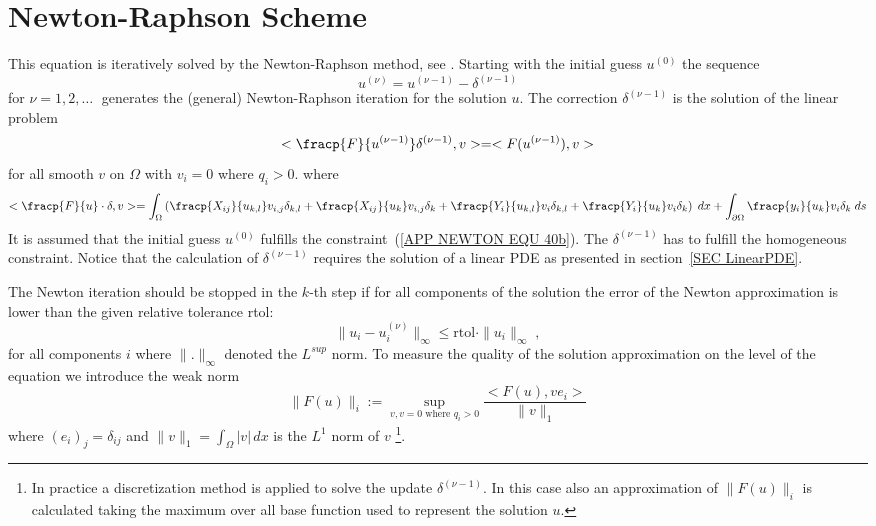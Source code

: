 \section{Newton-Raphson Scheme}
This equation is iteratively solved by the Newton-Raphson method, see \cite{Kelley2004a}.
Starting with the initial guess
$u^{(0)}$ the sequence
\begin{equation} \label{APP NEWTON EQU 43}
  u^{(\nu)}= u^{(\nu-1)} - \delta^{(\nu-1)}
\end{equation}
for $\nu=1,2,\ldots \;$ generates the (general) Newton-Raphson iteration for the
solution $u$. The correction $\delta^{(\nu-1)}$ is the solution of the linear problem
\begin{equation} \label{APP NEWTON EQU 43b0}
< \fracp{F}{u^{(\nu-1)}} \delta^{(\nu-1)} ,v > = <F(u^{(\nu-1)}),v>
\end{equation}
for all smooth $v$ on $\Omega$ with $v_i=0$ where $q_i>0$. 
where
\begin{equation} \label{APP NEWTON EQU 43b}
< \fracp{F}{u} \cdot \delta ,v > = 
\int_{\Omega} \left( \fracp{X_{ij}}{u_{k,l}} v_{i,j}\delta_{k,l} + 
\fracp{X_{ij}}{u_{k}} v_{i,j}\delta_{k} + \fracp{Y_{i}}{u_{k,l}} v_{i}\delta_{k,l} + 
\fracp{Y_{i}}{u_{k}} v_{i}\delta_{k} \right) \; dx 
+ \int_{\partial \Omega} 
\fracp{y_{i}}{u_{k}} v_{i}\delta_{k} \; ds 
\end{equation}
It is assumed that the initial guess $u^{(0)}$ fulfills the constraint~(\ref{APP NEWTON EQU 40b}). 
The $\delta^{(\nu-1)}$ has to fulfill the homogeneous constraint. 
Notice that the calculation of $\delta^{(\nu-1)}$ requires the solution of a linear PDE
as presented in section~\ref{SEC LinearPDE}.

The Newton iteration should be stopped in the $k$-th step if for
all components of the solution the error of the Newton
approximation is lower than the given relative tolerance {rtol}:
\begin{equation}\label{APP NEWTON EQU 61}
    \| u_{i} - u_{i}^{(\nu)} \|_{\infty} \le \mbox{rtol} \cdot \|u_{i} \|_{\infty}  \; ,
\end{equation}
for all components $i$ 
where $\|. \|_{\infty}$ denoted the $L^{sup}$ norm. To measure the quality of the solution approximation
on the level of the equation we introduce the weak norm
\begin{equation}\label{APP NEWTON EQU 62}
  \| F(u) \|_{i} := \sup_{v , v=0 \mbox{ where } q_{i}>0 } \frac{<F(u), ve_{i}>}{\|v\|_1}
\end{equation}
where $(e_{i})_{j}=\delta_{ij}$ and $\|v\|_1=\int_{\Omega} |v| \,dx$ is the $L^1$ norm of $v$
\footnote{In practice a discretization method is applied to solve the update $\delta^{(\nu-1)}$.
In this case also an approximation of $\| F(u) \|_{i}$ is calculated taking the maximum over all
base function used to represent the solution $u$.}.

